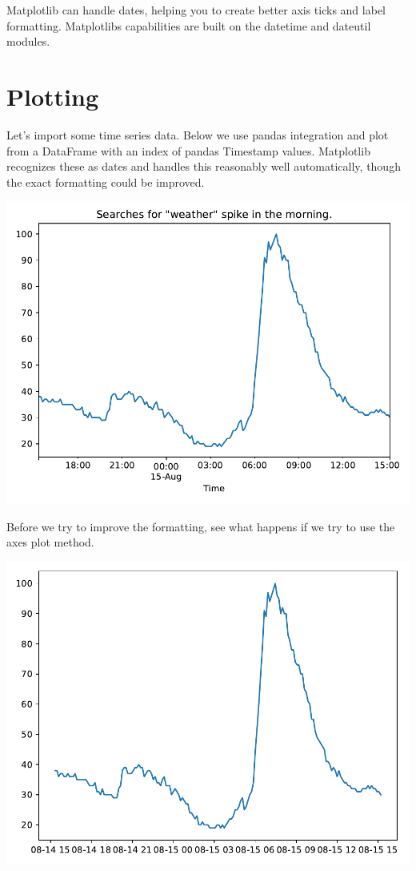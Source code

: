Matplotlib can handle dates, helping you to create better axis ticks and label formatting. Matplotlibs capabilities are built on the datetime and dateutil modules. 


\section{Plotting}
Let's import some time series data. Below we use pandas integration and plot from a DataFrame with an index of pandas Timestamp values. Matplotlib recognizes these as dates and handles this reasonably well automatically, though the exact formatting could be improved. 


\begin{center}
    \includegraphics[width = .7\textwidth]{figures/proseplots/pd-dates.pdf}
\end{center}

Before we try to improve the formatting, see what happens if we try to use the axes plot method. 


\begin{center}
    \includegraphics[width = .7\textwidth]{figures/proseplots/ax-dates.pdf}
\end{center}

